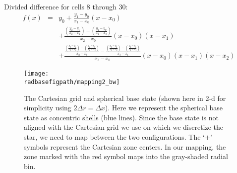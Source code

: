 Divided difference for cells 8 through 30:
\begin{eqnarray}
f(x) &=& y_0 + \frac{y_1-y_0}{x_1-x_0}(x-x_0) \nonumber \\
&& + \frac{\left(\frac{y_2-y_1}{x_2-x_1}\right)-\left(\frac{y_1-y_0}{x_1-x_0}\right)}{x_2-x_0}(x-x_0)(x-x_1) \nonumber \\
&& + \frac{\frac{\left(\frac{y_2-y_1}{x_2-x_1}\right)-\left(\frac{y_1-y_0}{x_1-x_0}\right)}{x_2-x_0}-\frac{\left(\frac{y_3-y_2}{x_3-x_2}\right)-\left(\frac{y_2-y_1}{x_2-x_1}\right)}{x_3-x_1}}{x_3-x_0}(x-x_0)(x-x_1)(x-x_2)
\end{eqnarray}

\clearpage

\begin{figure}[tpb]
\begin{center}
\texttt{[image: \\radbasefigpath/mapping2\_bw]}
\caption{\label{fig:mapping} The Cartesian grid and spherical base
state (shown here in 2-d for simplicity using $2 \Delta r = \Delta x$).
Here we represent the
spherical base state as concentric shells (blue lines).  Since the
base state is not aligned with the Cartesian grid we use on which
we discretize the star, we need to map between the two configurations.
The `$+$' symbols represent the Cartesian zone centers.  In our
mapping, the zone marked with the red symbol maps into the gray-shaded
radial bin. }
\label{fig:mapping}
\end{center}
\end{figure}
